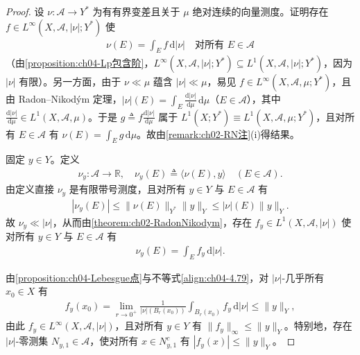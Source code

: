 \documentclass[../../main.tex]{subfiles}%
\begin{document}
\begin{proof}
设 $\nu:\mathcal{A}\to Y^*$ 为有有界变差且关于 $\mu$ 绝对连续的向量测度。证明存在 $f\in L^\infty(X,\mathcal{A},|\nu|;Y^*)$ 使
\begin{align}
\nu(E)=\int_E f\,\mathrm{d}|\nu|\quad\text{对所有 }E\in\mathcal{A} \label{align:ch04-4.77}
\end{align}
（由\cref{proposition:ch04-Lp包含阶}，$L^\infty(X,\mathcal{A},|\nu|;Y^*)\subseteq L^1(X,\mathcal{A},|\nu|;Y^*)$，因为 $|\nu|$ 有限）。另一方面，由于 $\nu\ll\mu$ 蕴含 $|\nu|\ll\mu$，易见 $f\in L^\infty(X,\mathcal{A},\mu;Y^*)$，且由 Radon--Nikodým 定理，$|\nu|(E)=\int_E\frac{\mathrm{d}|\nu|}{\mathrm{d}\mu}\,\mathrm{d}\mu$（$E\in\mathcal{A}$），其中 $\frac{\mathrm{d}|\nu|}{\mathrm{d}\mu}\in L^1(X,\mathcal{A},\mu)$。于是 $g\triangleq f\frac{\mathrm{d}|\nu|}{\mathrm{d}\mu}$ 属于 $L^1(X;Y^*)\equiv L^1(X,\mathcal{A},\mu;Y^*)$，且对所有 $E\in\mathcal{A}$ 有 $\nu(E)=\int_E g\,\mathrm{d}\mu$。故由\cref{remark:ch02-RN注}(i)得结果。

固定 $y\in Y$。定义
\begin{align}
\nu_y:\mathcal{A}\to\mathbb{R},\quad \nu_y(E)\triangleq \langle\nu(E),y\rangle\quad(E\in\mathcal{A}). \label{align:ch04-4.78}
\end{align}
由定义直接 $\nu_y$ 是有限带号测度，且对所有 $y\in Y$ 与 $E\in\mathcal{A}$ 有
\begin{align}
|\nu_y(E)|\leqslant\|\nu(E)\|_{Y^*}\|y\|_Y\leqslant|\nu|(E)\|y\|_Y. \label{align:ch04-4.79}
\end{align}
故 $\nu_y\ll|\nu|$，从而由\cref{theorem:ch02-RadonNikodym}，存在 $f_y\in L^1(X,\mathcal{A},|\nu|)$ 使对所有 $y\in Y$ 与 $E\in\mathcal{A}$ 有
\begin{align}
\nu_y(E)=\int_E f_y\,\mathrm{d}|\nu|. \label{align:ch04-4.80}
\end{align}

由\cref{proposition:ch04-Lebesgue点}与不等式\eqref{align:ch04-4.79}，对 $|\nu|$-几乎所有 $x_0\in X$ 有
\begin{align*}
f_y(x_0)=\lim_{r\to0^+}\frac1{|\nu|(B_r(x_0))}\int_{B_r(x_0)}f_y\,\mathrm{d}|\nu|\leqslant\|y\|_Y,
\end{align*}
由此 $f_y\in L^\infty(X,\mathcal{A},|\nu|)$，且对所有 $y\in Y$ 有 $\|f_y\|_\infty\leqslant\|y\|_Y$。特别地，存在 $|\nu|$-零测集 $N_{y,1}\in\mathcal{A}$，使对所有 $x\in N_{y,1}^c$ 有 $|f_y(x)|\leqslant\|y\|_Y$。


\end{proof}
\end{document}
